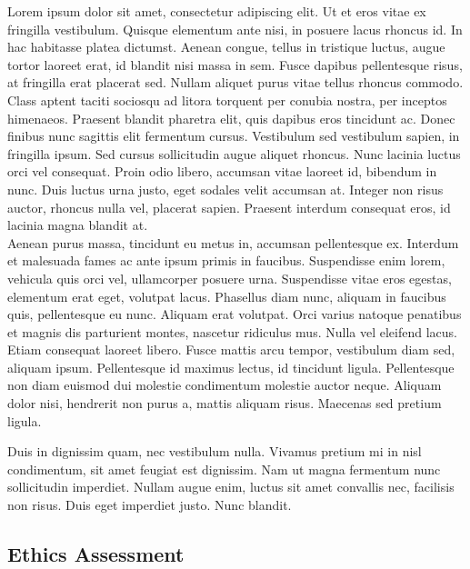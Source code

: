 Lorem ipsum dolor sit amet, consectetur adipiscing elit. Ut et eros vitae ex fringilla vestibulum. Quisque elementum ante nisi, in posuere lacus rhoncus id. In hac habitasse platea dictumst. Aenean congue, tellus in tristique luctus, augue tortor laoreet erat, id blandit nisi massa in sem. Fusce dapibus pellentesque risus, at fringilla erat placerat sed. Nullam aliquet purus vitae tellus rhoncus commodo. Class aptent taciti sociosqu ad litora torquent per conubia nostra, per inceptos himenaeos. Praesent blandit pharetra elit, quis dapibus eros tincidunt ac. Donec finibus nunc sagittis elit fermentum cursus. Vestibulum sed vestibulum sapien, in fringilla ipsum. Sed cursus sollicitudin augue aliquet rhoncus. Nunc lacinia luctus orci vel consequat. Proin odio libero, accumsan vitae laoreet id, bibendum in nunc. Duis luctus urna justo, eget sodales velit accumsan at. Integer non risus auctor, rhoncus nulla vel, placerat sapien. Praesent interdum consequat eros, id lacinia magna blandit at. \\

Aenean purus massa, tincidunt eu metus in, accumsan pellentesque ex. Interdum et malesuada fames ac ante ipsum primis in faucibus. Suspendisse enim lorem, vehicula quis orci vel, ullamcorper posuere urna. Suspendisse vitae eros egestas, elementum erat eget, volutpat lacus. Phasellus diam nunc, aliquam in faucibus quis, pellentesque eu nunc. Aliquam erat volutpat. Orci varius natoque penatibus et magnis dis parturient montes, nascetur ridiculus mus. Nulla vel eleifend lacus. Etiam consequat laoreet libero. Fusce mattis arcu tempor, vestibulum diam sed, aliquam ipsum. Pellentesque id maximus lectus, id tincidunt ligula. Pellentesque non diam euismod dui molestie condimentum molestie auctor neque. Aliquam dolor nisi, hendrerit non purus a, mattis aliquam risus. Maecenas sed pretium ligula.

Duis in dignissim quam, nec vestibulum nulla. Vivamus pretium mi in nisl condimentum, sit amet feugiat est dignissim. Nam ut magna fermentum nunc sollicitudin imperdiet. Nullam augue enim, luctus sit amet convallis nec, facilisis non risus. Duis eget imperdiet justo. Nunc blandit.

\subsection{Ethics Assessment} %

